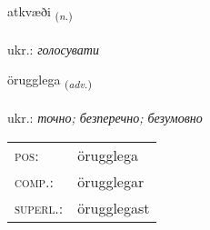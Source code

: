 \documentclass[frontgrid, backgrid]{flacards}\usepackage[]{graphicx}\usepackage[]{xcolor}
\begin{document}
\renewcommand{\flhead}{\vskip5pt \fboxsep=0pt {\small\bfseries\footnotesize Nafnorð | іменник}}
\renewcommand{\fcfoot}{\vskip5pt \fboxsep=0pt \hspace{2pt}{\small\bfseries\footnotesize 2K}}

\renewcommand{\blhead}{\vskip5pt {\small\bfseries\footnotesize Nafnorð | іменник }}
\renewcommand{\bcfoot}{\vskip5pt \hspace{2pt}{\small\bfseries\footnotesize 2K}}


{atkvæði \small{\textsubscript{(\textit{n.})}} \\[1ex] %
\textphonetic{[aːtkʰvaiðɪ]} \\
ukr.: \emph{голосувати} \\  [2ex]
\renewcommand*{\arraystretch}{0.8}
}

\renewcommand{\flhead}{\vskip5pt \fboxsep=0pt {\small\bfseries\footnotesize Atviksorð | прислівник}}
\renewcommand{\fcfoot}{\vskip5pt \fboxsep=0pt \hspace{2pt}{\small\bfseries\footnotesize 2K}}

\renewcommand{\blhead}{\vskip5pt {\small\bfseries\footnotesize Atviksorð | прислівник }}
\renewcommand{\bcfoot}{\vskip5pt \hspace{2pt}{\small\bfseries\footnotesize 2K}}


{örugglega \small{\textsubscript{(\textit{adv.})}} \\[1ex] %
\textphonetic{[œːrʏklɛɣa]} \\
ukr.: \emph{точно; безперечно; безумовно} \\  [2ex]
\renewcommand*{\arraystretch}{0.8}
\begin{tabular}{ll}
\textsc{pos}: & örugglega \\ 
\textsc{comp.}: & örugglegar \\ 
\textsc{superl.}: & örugglegast \\
\end{tabular}
}
\end{document}
